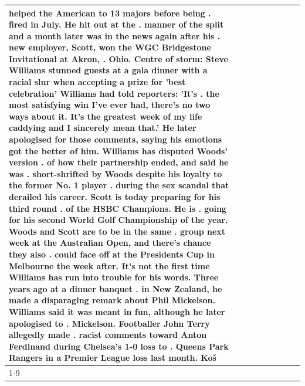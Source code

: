 \begin{table}[H]
\begin{tabular}{lllrlllll}
helped the American to 13 majors before being . fired in July. He hit out at the . manner of the split and a month later was in the news again after his . new employer, Scott, won the WGC Bridgestone Invitational at Akron, . Ohio. Centre of storm: Steve Williams stunned guests at a gala dinner with a racial slur when accepting a prize for 'best celebration' Williams had told reporters: 'It's . the most satisfying win I've ever had, there's no two ways about it. It's the greatest week of my life caddying and I sincerely mean that.' He later apologised for those comments, saying his emotions got the better of him. Williams has disputed Woods' version . of how their partnership ended, and said he was . short-shrifted by Woods despite his loyalty to the former No. 1 player . during the sex scandal that derailed his career. Scott is today preparing for his third round . of the HSBC Champions. He is . going for his second World Golf Championship of the year. Woods and Scott are to be in the same . group next week at the Australian Open, and there's chance they also . could face off at the Presidents Cup in Melbourne the week after. It's not the first time Williams has run into trouble for his words. Three years ago at a dinner banquet . in New Zealand, he made a disparaging remark about Phil Mickelson. Williams said it was meant in fun, although he later apologised to . Mickelson. Footballer John Terry allegedly made . racist comments toward Anton Ferdinand during Chelsea's 1-0 loss to . Queens Park Rangers in a Premier League loss last month. Koš \\
\cline{1-9}

\end{tabular}
\end{table}

